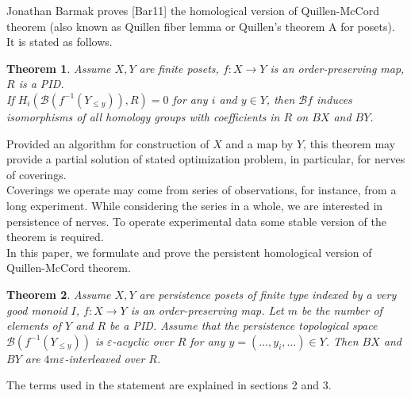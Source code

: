 \documentclass[english,12pt]{article}
\numberwithin{equation}{section}
\newtheorem*{theorem*}{Theorem}
\theoremstyle{definition}
\theoremstyle{remark}
\begin{document}
Jonathan Barmak proves [Bar11] the homological version of Quillen-McCord theorem (also known as Quillen fiber lemma or Quillen's theorem A for posets). It is stated as follows.
\begin{theorem*}
  Assume $X, Y$ are finite posets, $f : X \to Y$ is an order-preserving map, $R$ is a PID.\\
  If $H_i(\mathcal{B}(f^{-1}(Y_{\leqslant y})),R) = 0$ for any $i$ and $y \in Y$, then $\mathcal{B}f$ induces isomorphisms of all homology groups with coefficients in $R$ on $BX$ and $BY$.
\end{theorem*}

Provided an algorithm for construction of $X$ and a map by $Y$, this theorem may provide a partial solution of stated optimization problem, in particular, for nerves of coverings.\\

Coverings we operate may come from series of observations, for instance, from a long experiment. While considering the series in a whole, we are interested in persistence of nerves. To operate experimental data some stable version of the theorem is required.\\

In this paper, we formulate and prove the persistent homological version of Quillen-McCord theorem.
\begin{theorem*}
    Assume $X, Y$ are persistence posets of finite type indexed by a very good monoid $I$, $f : X \to Y$ is an order-preserving map. Let $m$ be the number of elements of $Y$ and $R$ be a PID. Assume that the persistence topological space $\mathcal{B}(f^{-1}(Y_{\leqslant y}))$ is $\varepsilon$-acyclic over $R$ for any $y=(\ldots,y_i,\ldots) \in Y$. Then $BX$ and $BY$ are $4m\varepsilon$-interleaved over $R$.\\
\end{theorem*}

The terms used in the statement are explained in sections 2 and 3.\\
\end{document}
